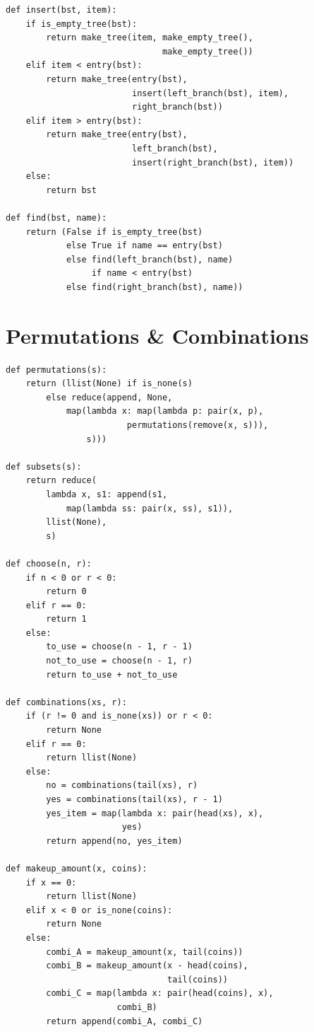 \documentclass[9pt,landscape]{extarticle}
\begin{document}
\begin{multicols*}{3}
\begin{lstlisting}
def insert(bst, item):
    if is_empty_tree(bst):
        return make_tree(item, make_empty_tree(),
                               make_empty_tree())
    elif item < entry(bst):
        return make_tree(entry(bst),
                         insert(left_branch(bst), item),
                         right_branch(bst))
    elif item > entry(bst):
        return make_tree(entry(bst),
                         left_branch(bst),
                         insert(right_branch(bst), item))
    else:
        return bst

def find(bst, name):
    return (False if is_empty_tree(bst)
            else True if name == entry(bst)
            else find(left_branch(bst), name)
                 if name < entry(bst)
            else find(right_branch(bst), name))
\end{lstlisting}

\section*{Permutations \& Combinations}
\begin{lstlisting}
def permutations(s):
    return (llist(None) if is_none(s)
        else reduce(append, None,
            map(lambda x: map(lambda p: pair(x, p),
                        permutations(remove(x, s))),
                s)))

def subsets(s):
    return reduce(
        lambda x, s1: append(s1,
            map(lambda ss: pair(x, ss), s1)),
        llist(None),
        s)

def choose(n, r):
    if n < 0 or r < 0:
        return 0
    elif r == 0:
        return 1
    else:
        to_use = choose(n - 1, r - 1)
        not_to_use = choose(n - 1, r)
        return to_use + not_to_use

def combinations(xs, r):
    if (r != 0 and is_none(xs)) or r < 0:
        return None
    elif r == 0:
        return llist(None)
    else:
        no = combinations(tail(xs), r)
        yes = combinations(tail(xs), r - 1)
        yes_item = map(lambda x: pair(head(xs), x),
                       yes)
        return append(no, yes_item)

def makeup_amount(x, coins):
    if x == 0:
        return llist(None)
    elif x < 0 or is_none(coins):
        return None
    else:
        combi_A = makeup_amount(x, tail(coins))
        combi_B = makeup_amount(x - head(coins),
                                tail(coins))
        combi_C = map(lambda x: pair(head(coins), x),
                      combi_B)
        return append(combi_A, combi_C)
\end{lstlisting}


\end{multicols*}
\end{document}
